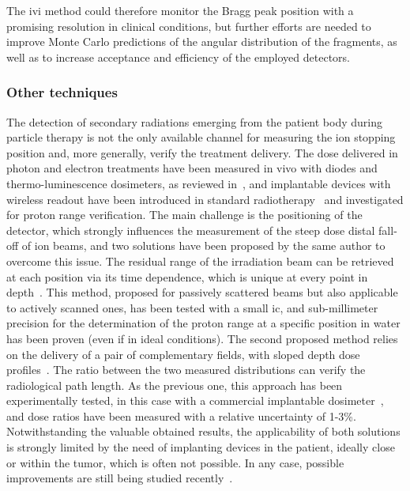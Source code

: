 The \gls{ivi} method could therefore monitor the Bragg peak position with a promising resolution in clinical conditions, but further efforts are needed to improve Monte Carlo predictions of the angular distribution of the fragments, as well as to increase acceptance and efficiency of the employed detectors. 

\subsubsection{Other techniques}\label{chap1::subsec::rangeComplTechniques}

The detection of secondary radiations emerging from the patient body during particle therapy is not the only available channel for measuring the ion stopping position and, more generally, verify the treatment delivery. The dose delivered in photon and electron treatments  have been measured in vivo with diodes and thermo-luminescence dosimeters, as reviewed in~\cite{Essers1999}, and implantable devices with wireless readout have been introduced in standard radiotherapy~\parencite{Black2005, Scarantino2008} and investigated for proton range verification. The main challenge is the positioning of the detector, which strongly influences the measurement of the steep dose distal fall-off of ion beams, and two solutions have been proposed by the same author to overcome this issue. 
The residual range of the irradiation beam can be retrieved at each position via its time dependence, which is unique at every point in depth~\parencite{Lu2008}. This method, proposed for passively scattered beams but also applicable to actively scanned ones, has been tested with a small \gls{ic}, and sub-millimeter precision for the determination of the proton range at a specific position in water has been proven (even if in ideal conditions). The second proposed method relies on the delivery of a pair of complementary fields, with sloped depth dose profiles~\parencite{Lu2008b}.  The ratio between the two measured distributions can verify the radiological path length. As the previous one, this approach has been experimentally tested, in this case with a commercial implantable dosimeter~\parencite{Lu2010}, and dose ratios have been measured with a relative uncertainty of 1-3\%. Notwithstanding the valuable obtained results, the applicability of both solutions is strongly limited by the need of implanting devices in the patient, ideally close or within the tumor, which is often not possible. In any case, possible improvements are still being studied recently~\parencite{Toltz2017}.
